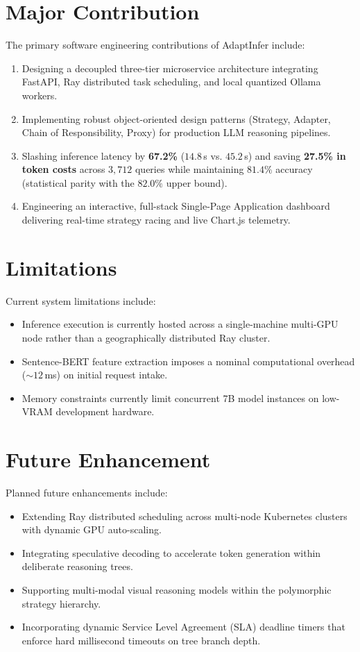 \documentclass[12pt,a4paper]{report}
\begin{document}
\section{Major Contribution}
\label{sec:major_contribution}
The primary software engineering contributions of AdaptInfer include:
\begin{enumerate}[leftmargin=*]
    \item Designing a decoupled three-tier microservice architecture integrating FastAPI, Ray distributed task scheduling, and local quantized Ollama workers.
    \item Implementing robust object-oriented design patterns (Strategy, Adapter, Chain of Responsibility, Proxy) for production LLM reasoning pipelines.
    \item Slashing inference latency by \textbf{67.2\%} ($14.8$\,s vs. $45.2$\,s) and saving \textbf{27.5\% in token costs} across $3,712$ queries while maintaining $81.4\%$ accuracy (statistical parity with the $82.0\%$ upper bound).
    \item Engineering an interactive, full-stack Single-Page Application dashboard delivering real-time strategy racing and live Chart.js telemetry.
\end{enumerate}

\section{Limitations}
\label{sec:limitations_conclusion}
Current system limitations include:
\begin{itemize}[leftmargin=*]
    \item Inference execution is currently hosted across a single-machine multi-GPU node rather than a geographically distributed Ray cluster.
    \item Sentence-BERT feature extraction imposes a nominal computational overhead ($\sim 12$\,ms) on initial request intake.
    \item Memory constraints currently limit concurrent 7B model instances on low-VRAM development hardware.
\end{itemize}

\section{Future Enhancement}
\label{sec:future_enhancement}
Planned future enhancements include:
\begin{itemize}[leftmargin=*]
    \item Extending Ray distributed scheduling across multi-node Kubernetes clusters with dynamic GPU auto-scaling.
    \item Integrating speculative decoding to accelerate token generation within deliberate reasoning trees.
    \item Supporting multi-modal visual reasoning models within the polymorphic strategy hierarchy.
    \item Incorporating dynamic Service Level Agreement (SLA) deadline timers that enforce hard millisecond timeouts on tree branch depth.
\end{itemize}
\end{document}
